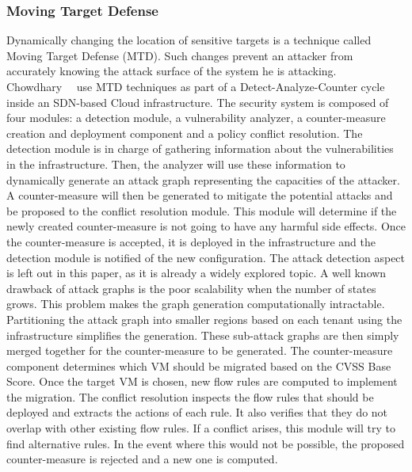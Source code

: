\subsubsection{Moving Target Defense}
Dynamically changing the location of sensitive targets is a technique called Moving Target Defense (MTD). Such changes prevent an attacker from accurately knowing the attack surface of the system he is attacking. 
Chowdhary~\etal~\cite{Chowdhary2016} use MTD techniques as part of a Detect-Analyze-Counter cycle inside an SDN-based Cloud infrastructure. 
The security system is composed of four modules: a detection module, a vulnerability analyzer, a counter-measure creation and deployment component and a policy conflict resolution.
The detection module is in charge of gathering information about the vulnerabilities in the infrastructure.
Then, the analyzer will use these information to dynamically generate an attack graph representing the capacities of the attacker. 
A counter-measure will then be generated to mitigate the potential attacks and be proposed to the conflict resolution module. This module  will determine if the newly created counter-measure is not going to have any harmful side effects. Once the counter-measure is accepted, it is deployed in the infrastructure and the detection module is notified of the new configuration. 
The attack detection aspect is left out in this paper, as it is already a widely explored topic.
A well known drawback of attack graphs is the poor scalability when the number of states grows.
This problem makes the graph generation computationally intractable. Partitioning the attack graph into smaller regions based on each tenant using the infrastructure simplifies the generation.
These sub-attack graphs are then simply merged together for the counter-measure to be generated.
The counter-measure component determines which VM should be migrated based on the CVSS Base Score.
Once the target VM is chosen, new flow rules are computed to implement the migration. 
The conflict resolution inspects the flow rules that should be deployed and extracts the actions of each rule. It also verifies that they do not overlap with other existing flow rules. If a conflict arises, this module will try to find alternative rules. In the event where this would not be possible, the proposed counter-measure is rejected and a new one is computed.

